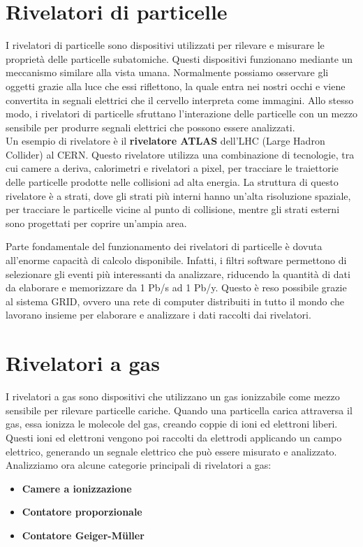 \section{Rivelatori di particelle}
I rivelatori di particelle sono dispositivi utilizzati per rilevare e misurare le proprietà delle particelle subatomiche. Questi dispositivi funzionano mediante un meccanismo similare alla vista umana. Normalmente possiamo osservare gli oggetti grazie alla luce che essi riflettono, la quale entra nei nostri occhi e viene convertita in segnali elettrici che il cervello interpreta come immagini. Allo stesso modo, i rivelatori di particelle sfruttano l'interazione delle particelle con un mezzo sensibile per produrre segnali elettrici che possono essere analizzati.\\
Un esempio di rivelatore è il \textbf{rivelatore ATLAS} dell'LHC (Large Hadron Collider) al CERN. Questo rivelatore utilizza una combinazione di tecnologie, tra cui camere a deriva, calorimetri e rivelatori a pixel, per tracciare le traiettorie delle particelle prodotte nelle collisioni ad alta energia. La struttura di questo rivelatore è a strati, dove gli strati più interni hanno un'alta risoluzione spaziale, per tracciare le particelle vicine al punto di collisione, mentre gli strati esterni sono progettati per coprire un'ampia area.


Parte fondamentale del funzionamento dei rivelatori di particelle è dovuta all'enorme capacità di calcolo disponibile. Infatti, i filtri software permettono di selezionare gli eventi più interessanti da analizzare, riducendo la quantità di dati da elaborare e memorizzare da 1 Pb/s ad 1 Pb/y. Questo è reso possibile grazie al sistema GRID, ovvero una rete di computer distribuiti in tutto il mondo che lavorano insieme per elaborare e analizzare i dati raccolti dai rivelatori.


\section{Rivelatori a gas}
I rivelatori a gas sono dispositivi che utilizzano un gas ionizzabile come mezzo sensibile per rilevare particelle cariche. Quando una particella carica attraversa il gas, essa ionizza le molecole del gas, creando coppie di ioni ed elettroni liberi. Questi ioni ed elettroni vengono poi raccolti da elettrodi applicando un campo elettrico, generando un segnale elettrico che può essere misurato e analizzato.\\
Analizziamo ora alcune categorie principali di rivelatori a gas:
\begin{itemize}
    \item \textbf{Camere a ionizzazione}
    \item \textbf{Contatore proporzionale}
    \item \textbf{Contatore Geiger-Müller}
\end{itemize}
